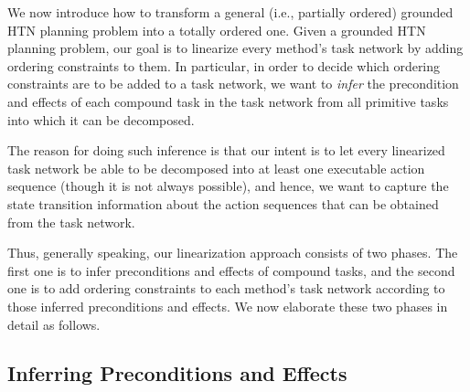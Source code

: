 We now introduce how to transform a general (i.e., partially ordered) grounded HTN planning problem into a totally ordered one. Given a grounded HTN planning problem, our goal is to linearize every method's task network by adding ordering constraints to them. In particular, in order to decide which ordering constraints are to be added to a task network, we want to \emph{infer} the precondition and effects of each compound task in the task network from all primitive tasks into which it can be decomposed. 

The reason for doing such inference is that our intent is to let every linearized task network be able to be decomposed into at least one executable action sequence (though it is not always possible), and hence, we want to capture the state transition information about the action sequences that can be obtained from the task network. %

Thus, generally speaking, our linearization approach consists of two phases. The first one is to infer preconditions and effects of compound tasks, and the second one is to add ordering constraints to each method's task network according to those inferred preconditions and effects. We now elaborate these two phases in detail as follows.

\subsection{Inferring Preconditions and Effects}